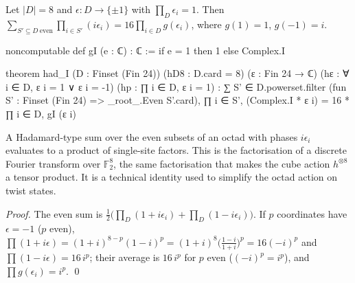 \begin{lemma}\label{ch13:lem:hadI}
Let $|D|=8$ and $\epsilon\colon D\to\{\pm1\}$ with $\prod_D\epsilon_i=1$. Then
$\sum_{S'\subseteq D\ \mathrm{even}}\prod_{i\in S'}(i\epsilon_i)=16\prod_{i\in D}g(\epsilon_i)$, where $g(1)=1$, $g(-1)=i$.
\end{lemma}
\begin{leancode}
noncomputable def gI (e : ℂ) : ℂ := if e = 1 then 1 else Complex.I

theorem had_I (D : Finset (Fin 24)) (hD8 : D.card = 8) (ε : Fin 24 → ℂ)
    (hε : ∀ i ∈ D, ε i = 1 ∨ ε i = -1) (hp : ∏ i ∈ D, ε i = 1) :
    ∑ S' ∈ D.powerset.filter (fun S' : Finset (Fin 24) => _root_.Even S'.card),
        ∏ i ∈ S', (Complex.I * ε i) = 16 * ∏ i ∈ D, gI (ε i)
\end{leancode}
\begin{physics}
A Hadamard-type sum over the even subsets of an octad with phases $i\epsilon_i$ evaluates to a product of single-site factors. This is the factorisation of a discrete Fourier transform over $\mathbb F_2^8$, the same factorisation that makes the cube action $h^{\otimes 8}$ a tensor product. It is a technical identity used to simplify the octad action on twist states.
\end{physics}
\noindent\emph{Proof.} The even sum is $\tfrac12\bigl(\prod_D(1+i\epsilon_i)+\prod_D(1-i\epsilon_i)\bigr)$. If $p$ coordinates
have $\epsilon=-1$ ($p$ even), $\prod(1+i\epsilon)=(1+i)^{8-p}(1-i)^p=(1+i)^8\bigl(\tfrac{1-i}{1+i}\bigr)^p=16(-i)^p$ and
$\prod(1-i\epsilon)=16\,i^p$; their average is $16\,i^p$ for $p$ even ($(-i)^p=i^p$), and $\prod g(\epsilon_i)=i^p$. \qed

